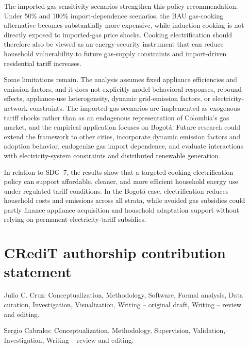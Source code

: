 \documentclass[authoryear,preprint,review,10pt]{elsarticle}
\begin{document}
The imported-gas sensitivity scenarios strengthen this policy recommendation. Under 50\% and 100\% import-dependence scenarios, the BAU gas-cooking alternative becomes substantially more expensive, while induction cooking is not directly exposed to imported-gas price shocks. Cooking electrification should therefore also be viewed as an energy-security instrument that can reduce household vulnerability to future gas-supply constraints and import-driven residential tariff increases.

Some limitations remain. The analysis assumes fixed appliance efficiencies and emission factors, and it does not explicitly model behavioral responses, rebound effects, appliance-use heterogeneity, dynamic grid-emission factors, or electricity-network constraints. The imported-gas scenarios are implemented as exogenous tariff shocks rather than as an endogenous representation of Colombia's gas market, and the empirical application focuses on Bogotá. Future research could extend the framework to other cities, incorporate dynamic emission factors and adoption behavior, endogenize gas import dependence, and evaluate interactions with electricity-system constraints and distributed renewable generation.

In relation to SDG~7, the results show that a targeted cooking-electrification policy can support affordable, cleaner, and more efficient household energy use under regulated tariff conditions. In the Bogotá case, electrification reduces household costs and emissions across all strata, while avoided gas subsidies could partly finance appliance acquisition and household adaptation support without relying on permanent electricity-tariff subsidies.


\section*{CRediT authorship contribution statement}

Julio C. Cruz: Conceptualization, Methodology, Software, Formal analysis, Data curation, Investigation, Visualization, Writing -- original draft, Writing -- review and editing.

Sergio Cabrales: Conceptualization, Methodology, Supervision, Validation, Investigation, Writing -- review and editing.

\end{document}
